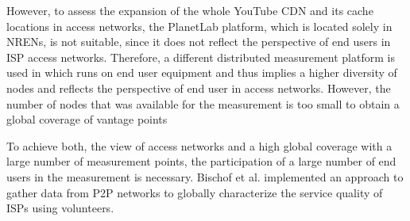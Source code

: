 However, to assess the expansion of the whole YouTube CDN and its cache locations in access networks, the PlanetLab platform, which is located solely in NRENs, is not suitable, since it does not reflect the perspective of end users in ISP access networks.
Therefore, a different distributed measurement platform is used in \cite{rafetseder2011exploring} which runs on end user equipment and thus implies a higher diversity of nodes and reflects the perspective of end user in access networks.
However, the number of nodes that was available for the measurement is too small to obtain a global coverage of vantage points

To achieve both, the view of access networks and a high global coverage with a large number of measurement points, the participation of a large number of end users in the measurement is necessary.
Bischof et al. \cite{bischof2011crowdsourcing} implemented an approach to gather data from P2P networks to globally characterize the service quality of ISPs using volunteers.

